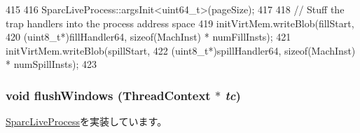 \begin{DoxyCode}
415 {
416     SparcLiveProcess::argsInit<uint64_t>(pageSize);
417 
418     // Stuff the trap handlers into the process address space
419     initVirtMem.writeBlob(fillStart,
420             (uint8_t*)fillHandler64, sizeof(MachInst) * numFillInsts);
421     initVirtMem.writeBlob(spillStart,
422             (uint8_t*)spillHandler64, sizeof(MachInst) *  numSpillInsts);
423 }
\end{DoxyCode}
\hypertarget{classSparc64LiveProcess_ac36137c98f2b65736e0c5745c3c90c85}{
\subsubsection[{flushWindows}]{\setlength{\rightskip}{0pt plus 5cm}void flushWindows ({\bf ThreadContext} $\ast$ {\em tc})}}
\label{classSparc64LiveProcess_ac36137c98f2b65736e0c5745c3c90c85}


\hyperlink{classSparcLiveProcess_ab39e13308fa993d443b20e56572106f5}{SparcLiveProcess}を実装しています。


